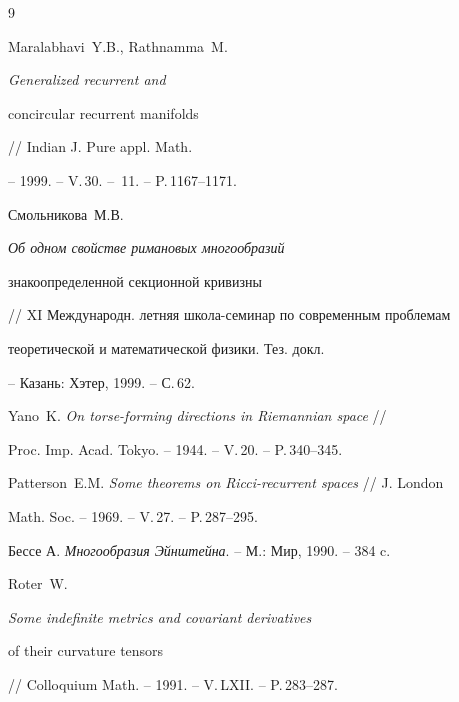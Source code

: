 \begin{thebibliography}{9}







Maralabhavi~Y.B., Rathnamma~M. {\it Generalized recurrent and


concircular recurrent manifolds} // Indian J. Pure appl. Math.


-- 1999. -- V.\,30. -- \No\,11. -- P.\,1167--1171.







Смольникова~М.В. {\it Об одном свойстве римановых многообразий


знакоопределенной секционной кривизны}


// XI Международн. летняя школа-семинар по современным проблемам 


теоретической и математической физики. Тез. докл.


-- Казань: Хэтер, 1999. -- С.\,62.







Yano~K. {\it On torse-forming directions in Riemannian space} //


Proc. Imp. Acad. Tokyo. -- 1944. -- V.\,20. -- P.\,340--345.







Patterson~E.M. {\it Some theorems on Ricci-recurrent spaces} // J. London


Math. Soc. -- 1969. -- V.\,27. -- P.\,287--295.







Бессе А. {\it Многообразия Эйнштейна}. -- М.: Мир, 1990. -- 384 c.







Roter~W. {\it Some indefinite metrics and covariant derivatives


of their curvature tensors}


// Colloquium Math. -- 1991. -- V.\,LXII. -- P.\,283--287.





\end{thebibliography}





\vskip 2cm












\label{end}





